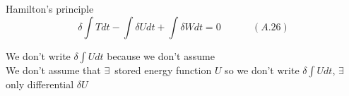 \begin{appendix}
Hamilton's principle
\begin{equation}
\delta \int T dt - \int \delta U dt + \int \delta W dt = 0 \quad \quad \quad \, (A.26)
\end{equation}

We don't write $\delta \int U dt $ because we don't assume \\

We don't assume that $\exists \, $ stored energy function $U$ so we don't write $\delta \int U dt$, $\exists \, $ only differential $\delta U$

\end{appendix}


